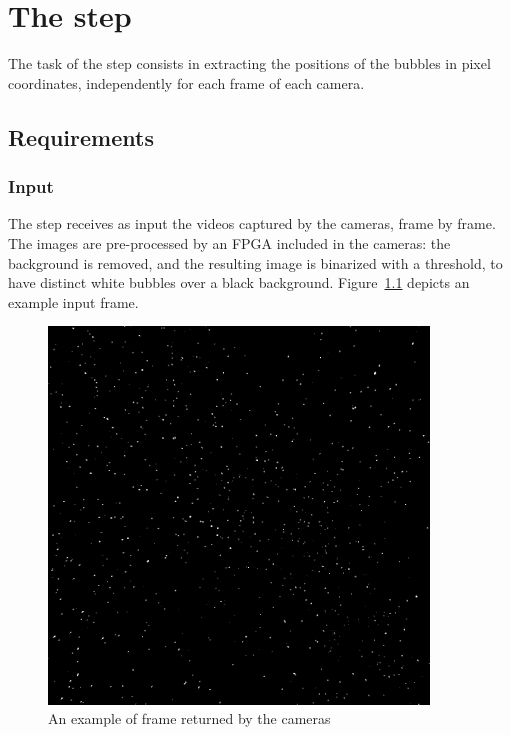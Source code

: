 \chapter{The \locate* step}
\label{chap:locate}

\newcommand{\locateimgsize}{0.9\textwidth}

The task of the \locate* step consists in extracting the positions of the bubbles in pixel coordinates, independently for each frame of each camera.

\section{Requirements}

\subsection{Input}
The \locate* step receives as input the videos captured by the cameras, frame by frame.
The images are pre-processed by an FPGA included in the cameras: the background is removed, and the resulting image is binarized with a threshold, to have distinct white bubbles over a black background.
Figure~\ref{fig:locate:original} depicts an example input frame.

\begin{figure}
	\centerline{\includegraphics[width=\locateimgsize]{images/locate/_original-frame-full.png}}
	\caption{\centering An example of frame returned by the cameras}
	\label{fig:locate:original}
\end{figure}

